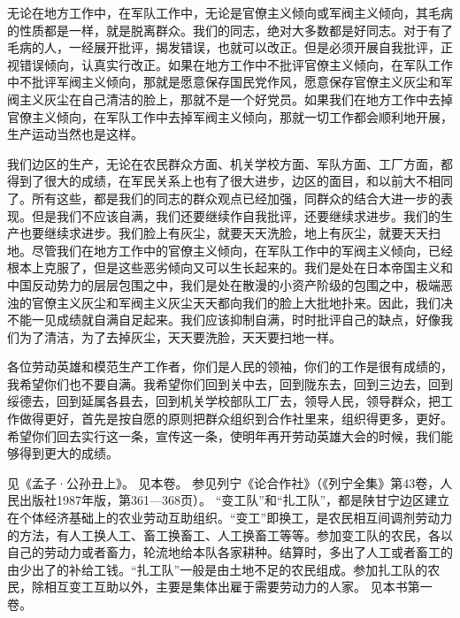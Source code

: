 无论在地方工作中，在军队工作中，无论是官僚主义倾向或军阀主义倾向，其毛病的性质都是一样，就是脱离群众。我们的同志，绝对大多数都是好同志。对于有了毛病的人，一经展开批评，揭发错误，也就可以改正。但是必须开展自我批评，正视错误倾向，认真实行改正。如果在地方工作中不批评官僚主义倾向，在军队工作中不批评军阀主义倾向，那就是愿意保存国民党作风，愿意保存官僚主义灰尘和军阀主义灰尘在自己清洁的脸上，那就不是一个好党员。如果我们在地方工作中去掉官僚主义倾向，在军队工作中去掉军阀主义倾向，那就一切工作都会顺利地开展，生产运动当然也是这样。

我们边区的生产，无论在农民群众方面、机关学校方面、军队方面、工厂方面，都得到了很大的成绩，在军民关系上也有了很大进步，边区的面目，和以前大不相同了。所有这些，都是我们的同志的群众观点已经加强，同群众的结合大进一步的表现。但是我们不应该自满，我们还要继续作自我批评，还要继续求进步。我们的生产也要继续求进步。我们脸上有灰尘，就要天天洗脸，地上有灰尘，就要天天扫地。尽管我们在地方工作中的官僚主义倾向，在军队工作中的军阀主义倾向，已经根本上克服了，但是这些恶劣倾向又可以生长起来的。我们是处在日本帝国主义和中国反动势力的层层包围之中，我们是处在散漫的小资产阶级的包围之中，极端恶浊的官僚主义灰尘和军阀主义灰尘天天都向我们的脸上大批地扑来。因此，我们决不能一见成绩就自满自足起来。我们应该抑制自满，时时批评自己的缺点，好像我们为了清洁，为了去掉灰尘，天天要洗脸，天天要扫地一样。

各位劳动英雄和模范生产工作者，你们是人民的领袖，你们的工作是很有成绩的，我希望你们也不要自满。我希望你们回到关中去，回到陇东去，回到三边去，回到绥德去，回到延属各县去，回到机关学校部队工厂去，领导人民，领导群众，把工作做得更好，首先是按自愿的原则把群众组织到合作社里来，组织得更多，更好。希望你们回去实行这一条，宣传这一条，使明年再开劳动英雄大会的时候，我们能够得到更大的成绩。


\begin{maonote}
见《孟子·公孙丑上》。
见本卷。
参见列宁《论合作社》（《列宁全集》第43卷，人民出版社1987年版，第361—368页）。
“变工队”和“扎工队”，都是陕甘宁边区建立在个体经济基础上的农业劳动互助组织。“变工”即换工，是农民相互间调剂劳动力的方法，有人工换人工、畜工换畜工、人工换畜工等等。参加变工队的农民，各以自己的劳动力或者畜力，轮流地给本队各家耕种。结算时，多出了人工或者畜工的由少出了的补给工钱。“扎工队”一般是由土地不足的农民组成。参加扎工队的农民，除相互变工互助以外，主要是集体出雇于需要劳动力的人家。
见本书第一卷。
\end{maonote}
